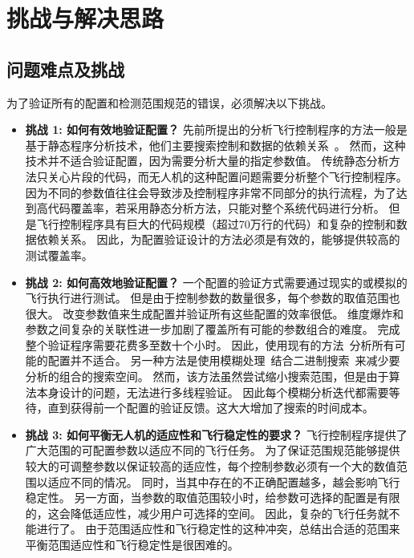 \section{挑战与解决思路}

\subsection{问题难点及挑战}
为了验证所有的配置和检测范围规范的错误，必须解决以下挑战。

\begin{itemize}
    \item \textbf{挑战 1: 如何有效地验证配置？}
先前所提出的分析飞行控制程序的方法一般是基于静态程序分析技术，他们主要搜索控制和数据的依赖关系~\cite{mayday,Believing,zhu2019new}。
然而，这种技术并不适合验证配置，因为需要分析大量的指定参数值。
传统静态分析方法只关心片段的代码，而无人机的这种配置问题需要分析整个飞行控制程序。
因为不同的参数值往往会导致涉及控制程序非常不同部分的执行流程，为了达到高代码覆盖率，若采用静态分析方法，只能对整个系统代码进行分析。
但是飞行控制程序具有巨大的代码规模（超过70万行的代码）和复杂的控制和数据依赖关系。
因此，为配置验证设计的方法必须是有效的，能够提供较高的测试覆盖率。

    \item \textbf{挑战 2: 如何高效地验证配置？}
一个配置的验证方式需要通过现实的或模拟的飞行执行进行测试。
但是由于控制参数的数量很多，每个参数的取值范围也很大。
改变参数值来生成配置并验证所有这些配置的效率很低。
维度爆炸和参数之间复杂的关联性进一步加剧了覆盖所有可能的参数组合的难度。
完成整个验证程序需要花费多至数十个小时。
因此，使用现有的方法~\cite{tartler,halin2019test}分析所有可能的配置并不适合。
另一种方法是使用模糊处理~\cite{rvfuzzer}结合二进制搜索~\cite{knuth1971optimum}来减少要分析的组合的搜索空间。
然而，该方法虽然尝试缩小搜索范围，但是由于算法本身设计的问题，无法进行多线程验证。
因此每个模糊分析迭代都需要等待，直到获得前一个配置的验证反馈。这大大增加了搜索的时间成本。


    \item \textbf{挑战 3: 如何平衡无人机的适应性和飞行稳定性的要求？}
飞行控制程序提供了广大范围的可配置参数以适应不同的飞行任务。
为了保证范围规范能够提供较大的可调整参数以保证较高的适应性，每个控制参数必须有一个大的数值范围以适应不同的情况。
同时，当其中存在的不正确配置越多，越会影响飞行稳定性。
另一方面，当参数的取值范围较小时，给参数可选择的配置是有限的，这会降低适应性，减少用户可选择的空间。
因此，复杂的飞行任务就不能进行了。
由于范围适应性和飞行稳定性的这种冲突，总结出合适的范围来平衡范围适应性和飞行稳定性是很困难的。
\end{itemize}




